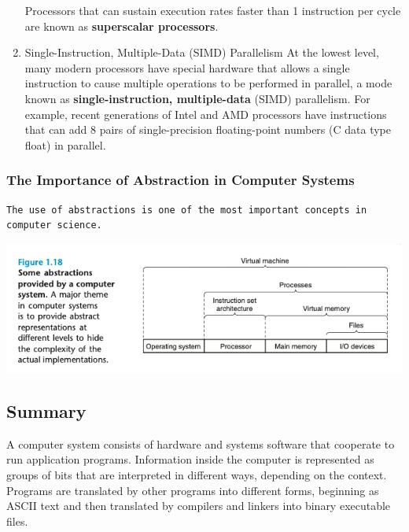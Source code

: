 \documentclass[11pt]{article}
\begin{document}
\begin{enumerate}
Processors that can sustain execution rates faster than 1 instruction per cycle are known as \textbf{superscalar processors}.\\

\item Single-Instruction, Multiple-Data (SIMD) Parallelism
\label{sec:org558a260}
At the lowest level, many modern processors have special hardware that allows a single instruction to cause multiple operations to be performed in parallel, a mode known as \textbf{single-instruction, multiple-data} (SIMD) parallelism. For example, recent generations of Intel and AMD processors have instructions that can add 8 pairs of single-precision floating-point numbers (C data type float) in parallel.\\
\end{enumerate}

\subsubsection{The Importance of Abstraction in Computer Systems}
\label{sec:org5cc0ae6}
\begin{verbatim}
The use of abstractions is one of the most important concepts in computer science.
\end{verbatim}

\begin{center}
\includegraphics[width=.9\linewidth]{pics/some-abstractions-provided-by-a-computer-system.png}
\end{center}

\subsection{Summary}
\label{sec:orgdefc095}
A computer system consists of hardware and systems software that cooperate to run application programs. Information inside the computer is represented as groups of bits that are interpreted in different ways, depending on the context. Programs are translated by other programs into different forms, beginning as ASCII text and then translated by compilers and linkers into binary executable files.\\
\end{document}
